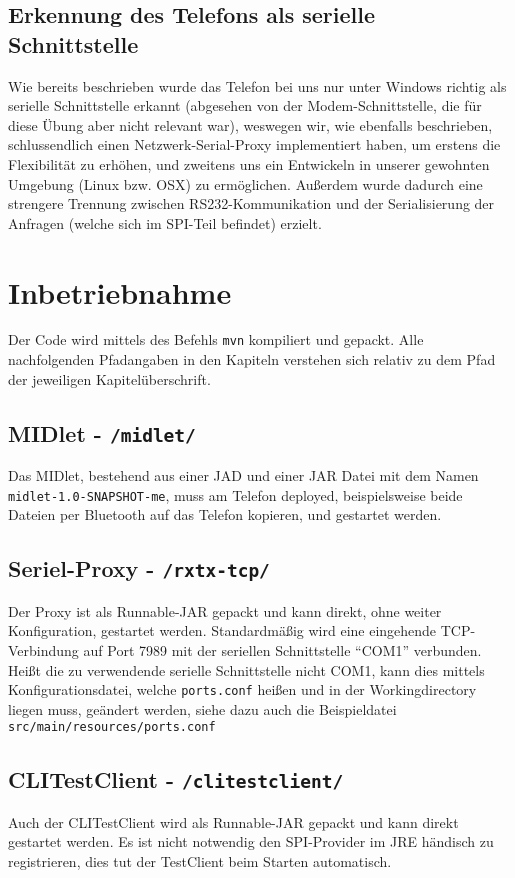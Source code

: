 \documentclass[paper=a4, fontsize=11pt]{scrartcl}
\begin{document}
\subsection{Erkennung des Telefons als serielle Schnittstelle}
Wie bereits beschrieben wurde das Telefon bei uns nur unter Windows richtig als serielle Schnittstelle erkannt (abgesehen von der Modem-Schnittstelle, die für diese Übung aber nicht relevant war), weswegen wir, wie ebenfalls beschrieben, schlussendlich einen Netzwerk-Serial-Proxy implementiert haben, um erstens die Flexibilität zu erhöhen, und zweitens uns ein Entwickeln in unserer gewohnten Umgebung (Linux bzw. OSX) zu ermöglichen. Außerdem wurde dadurch eine strengere Trennung zwischen RS232-Kommunikation und der Serialisierung der Anfragen (welche sich im SPI-Teil befindet) erzielt.


\section{Inbetriebnahme}
Der Code wird mittels des Befehls \texttt{mvn} kompiliert und gepackt. Alle nachfolgenden Pfadangaben in den Kapiteln verstehen sich relativ zu dem Pfad der jeweiligen Kapitelüberschrift.

\subsection{MIDlet - \texttt{/midlet/}}
Das MIDlet, bestehend aus einer JAD und einer JAR Datei mit dem Namen \texttt{midlet-1.0-SNAPSHOT-me}, muss am Telefon deployed, beispielsweise beide Dateien per Bluetooth auf das Telefon kopieren, und gestartet werden.

\subsection{Seriel-Proxy -  \texttt{/rxtx-tcp/}}
Der Proxy ist als Runnable-JAR gepackt und kann direkt, ohne weiter Konfiguration, gestartet werden. Standardmäßig wird eine eingehende TCP-Verbindung auf Port 7989 mit der seriellen Schnittstelle \enquote{COM1} verbunden. Heißt die zu verwendende serielle Schnittstelle nicht COM1, kann dies mittels Konfigurationsdatei, welche \texttt{ports.conf} heißen und in der Workingdirectory liegen muss, geändert werden, siehe dazu auch die Beispieldatei \texttt{src/main/resources/ports.conf}

\subsection{CLITestClient -  \texttt{/clitestclient/}}
Auch der CLITestClient wird als Runnable-JAR gepackt und kann direkt gestartet werden. Es ist nicht notwendig den SPI-Provider im JRE händisch zu registrieren, dies tut der TestClient beim Starten automatisch.
\end{document}
